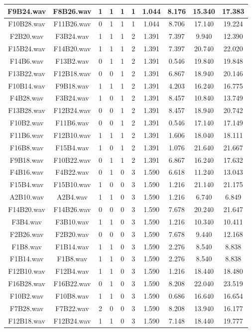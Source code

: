\documentclass[11pt,a4paper]{book}
\begin{document}
\begin{longtable}[c]{|c|c|c|c|c|c|c|c|c|c|}
F9B24.wav&F8B26.wav&1&1&1&1&1.044&8.176&15.340&17.383\\ \hline
F10B28.wav&F11B26.wav&0&1&1&1&1.044&8.706&17.140&19.224\\ \hline
F2B20.wav&F3B24.wav&1&1&1&2&1.391&7.397&9.940&12.390\\ \hline
F15B24.wav&F14B20.wav&1&1&1&2&1.391&7.397&20.740&22.020\\ \hline
F14B6.wav&F13B2.wav&0&1&1&2&1.391&0.546&19.840&19.848\\ \hline
F13B22.wav&F12B18.wav&0&0&1&2&1.391&6.867&18.940&20.146\\ \hline
F10B14.wav&F9B18.wav&1&1&1&2&1.391&4.203&16.240&16.775\\ \hline
F4B28.wav&F3B24.wav&1&0&1&2&1.391&8.457&10.840&13.749\\ \hline
F13B28.wav&F12B24.wav&0&0&1&2&1.391&8.457&18.940&20.742\\ \hline
F10B2.wav&F11B6.wav&0&0&1&2&1.391&0.546&17.140&17.149\\ \hline
F11B6.wav&F12B10.wav&1&1&1&2&1.391&1.606&18.040&18.111\\ \hline
F16B8.wav&F15B4.wav&1&0&1&2&1.391&1.076&21.640&21.667\\ \hline
F9B18.wav&F10B22.wav&0&1&1&2&1.391&6.867&16.240&17.632\\ \hline
F4B16.wav&F4B22.wav&0&1&0&3&1.590&6.618&11.240&13.043\\ \hline
F15B4.wav&F15B10.wav&1&0&0&3&1.590&1.216&21.140&21.175\\ \hline
A2B10.wav&A2B4.wav&1&1&0&3&1.590&1.216&6.740&6.849\\ \hline
F14B20.wav&F14B26.wav&0&0&0&3&1.590&7.678&20.240&21.647\\ \hline
F3B4.wav&F3B10.wav&1&1&0&3&1.590&1.216&10.340&10.411\\ \hline
F2B26.wav&F2B20.wav&0&0&0&3&1.590&7.678&9.440&12.168\\ \hline
F1B8.wav&F1B14.wav&1&1&0&3&1.590&2.276&8.540&8.838\\ \hline
F1B14.wav&F1B8.wav&1&1&0&3&1.590&2.276&8.540&8.838\\ \hline
F12B10.wav&F12B4.wav&1&1&0&3&1.590&1.216&18.440&18.480\\ \hline
F16B28.wav&F16B22.wav&0&1&0&3&1.590&8.208&22.040&23.519\\ \hline
F10B2.wav&F10B8.wav&1&1&0&3&1.590&0.686&16.640&16.654\\ \hline
F7B28.wav&F7B22.wav&2&0&0&3&1.590&8.208&13.940&16.177\\ \hline
F12B18.wav&F12B24.wav&1&1&0&3&1.590&7.148&18.440&19.777\\ \hline

\end{longtable}
\end{document}
